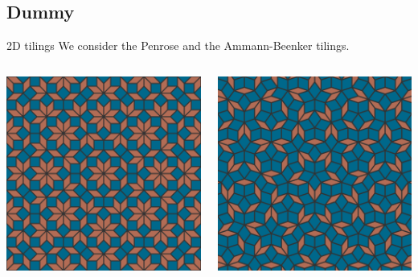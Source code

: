 \documentclass[xcolor=x11names,compress,professionalfonts]{beamer}
\renewcommand{\(}{\begin{columns}}
\renewcommand{\)}{\end{columns}}
\newcommand{\<}[1]{\begin{column}{#1}}
\renewcommand{\>}{\end{column}}
\begin{document}
\subsection{Dummy}

\begin{frame}{2D tilings}
We consider the Penrose and the Ammann-Beenker tilings.
\begin{columns}
\begin{column}{5cm}
{\centering
\includegraphics[scale=.08]{img/ammann-beenker.png}

}
\end{column}
\begin{column}{5cm}
{\centering
\includegraphics[scale=.08]{img/penrose.png}

}
\end{column}
\end{columns}
\end{frame}
\end{document}
